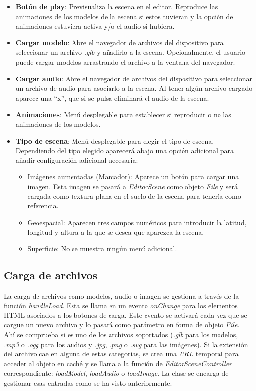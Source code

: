 \begin{itemize}
    \item \textbf{Botón de play}: Previsualiza la escena en el editor. Reproduce las animaciones de los modelos de la escena si estos tuvieran y la opción de animaciones estuviera activa y/o el audio si hubiera.
    \item \textbf{Cargar modelo}: Abre el navegador de archivos del dispositivo para seleccionar un archivo \textit{.glb} y añadirlo a la escena. Opcionalmente, el usuario puede cargar modelos arrastrando el archivo a la ventana del navegador.
    \item \textbf{Cargar audio}: Abre el navegador de archivos del dispositivo para seleccionar un archivo de audio para asociarlo a la escena. Al tener algún archivo cargado aparece una ``x'', que si se pulsa eliminará el audio de la escena.
    \item \textbf{Animaciones}: Menú desplegable para establecer si reproducir o no las animaciones de los modelos.
    \item \textbf{Tipo de escena}: Menú desplegable para elegir el tipo de escena. Dependiendo del tipo elegido aparecerá abajo una opción adicional para añadir configuración adicional necesaria:
        \begin{itemize}
            \item Imágenes aumentadas (Marcador): Aparece un botón para cargar una imagen. Esta imagen se pasará a \textit{EditorScene} como objeto \textit{File} y será cargada como textura plana en el suelo de la escena para tenerla como referencia.
            \item Geoespacial: Aparecen tres campos numéricos para introducir la latitud, longitud y altura a la que se desea que aparezca la escena.
            \item Superficie: No se muestra ningún menú adicional.
        \end{itemize}
\end{itemize}

\subsection{Carga de archivos}

La carga de archivos como modelos, audio o imagen se gestiona a través de la función \textit{handleLoad}. Esta se llama en un evento \textit{onChange} para los elementos HTML asociados a los botones de carga. Este evento se activará cada vez que se cargue un nuevo archivo y lo pasará como parámetro en forma de objeto \textit{File}. Ahí se comprueba si es uno de los archivos soportados (\textit{.glb} para los modelos, \textit{.mp3} o \textit{.ogg} para los audios y \textit{.jpg}, \textit{.png} o \textit{.svg} para las imágenes). Si la extensión del archivo cae en alguna de estas categorías, se crea una \textit{URL} temporal para acceder al objeto en caché y se llama a la función de \textit{EditorSceneController} correspondiente: \textit{loadModel}, \textit{loadAudio} o \textit{loadImage}. La clase se encarga de gestionar esas entradas como se ha visto anteriormente.

